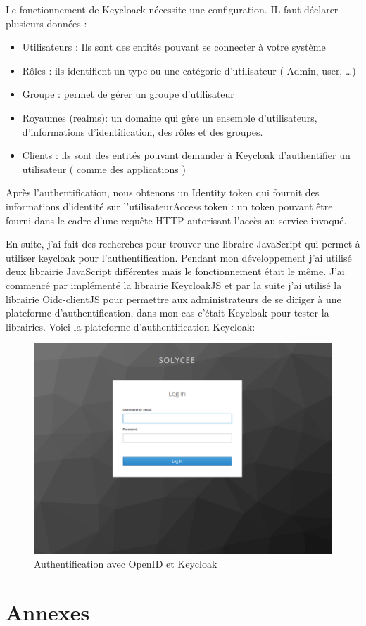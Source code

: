 \documentclass[12pt]{article}
\begin{document}
Le fonctionnement de Keycloack nécessite  une configuration. IL faut déclarer plusieurs données : 
\begin{itemize}
\item Utilisateurs : Ils sont des entités pouvant se connecter à votre système
\item Rôles : ils identifient un type ou une catégorie d’utilisateur ( Admin, user, …)
\item Groupe : permet de gérer un groupe d’utilisateur
\item Royaumes (realms): un domaine qui gère un ensemble d’utilisateurs, d’informations d’identification, des rôles et des groupes.
\item Clients : ils sont des entités pouvant demander à Keycloak d’authentifier un utilisateur ( comme des applications )
\end{itemize}

Après l’authentification, nous obtenons un Identity token qui fournit des informations d’identité sur l’utilisateurAccess token : un token pouvant être fourni dans le cadre d’une requête HTTP autorisant l’accès au service invoqué.

En suite, j'ai fait des recherches pour trouver une libraire JavaScript qui permet à utiliser keycloak pour l'authentification. Pendant mon développement j'ai utilisé deux librairie JavaScript différentes mais le fonctionnement était le même. J'ai commencé par implémenté la librairie KeycloakJS et par la suite j'ai utilisé la librairie Oidc-clientJS pour permettre aux administrateurs de se diriger à une plateforme d'authentification, dans mon cas c'était Keycloak pour tester la librairies. Voici la plateforme d'authentification Keycloak: 
 \begin{figure}[H]
	\centering
 		\includegraphics[width=1\textwidth]{diagrammes/authentification_keycloak.png} 
  		\caption{Authentification avec OpenID et Keycloak }
	\end{figure}

\newpage
\section{Annexes}
\end{document}
